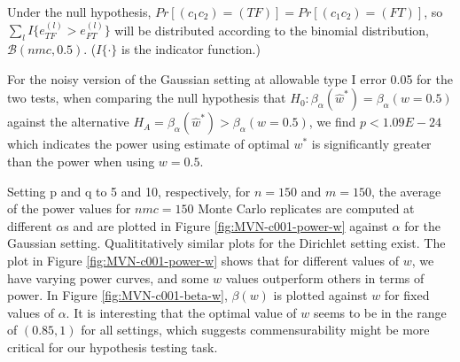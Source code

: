 \documentclass[11pt]{article} %
\begin{document}
Under the null  hypothesis, $Pr[\left(c_1c_2\right)=(TF)]=Pr[\left(c_1c_2\right)=(FT)]$, so $\sum_l{I \{e_{TF}^{(l)}>e_{FT}^{(l)}\}}$ will be distributed according to  the binomial distribution, $\mathcal{B}(nmc,0.5)$. ($I\{\cdot\}$ is the indicator function.) 

For the noisy version of the Gaussian setting at allowable type I error 0.05 for the two tests, when comparing  the null hypothesis that  $H_{0}: \beta_{\alpha}({\hat{w}^*})=\beta_{\alpha}({w=0.5})$ against the alternative $H_{A}=\beta_{\alpha}({\hat{w}^*})>\beta_{\alpha}({w=0.5})$, we find $p<1.09E-24$ which indicates the power using estimate of optimal $w^*$ is significantly greater than the power when using $w=0.5$. 





Setting p and q to 5 and 10, respectively, for $n=150$ and $m=150$, the average of the power values for $nmc=150$ Monte Carlo replicates are computed at  different $\alpha$s and are plotted in Figure \ref{fig:MVN-c001-power-w} against $\alpha$ for the Gaussian setting.  Qualititatively similar plots for the Dirichlet setting  exist.  The plot in Figure \ref{fig:MVN-c001-power-w} shows that for different values of  $w$, we have varying power curves, and some $w$ values outperform others in terms of power. In Figure \ref{fig:MVN-c001-beta-w},  $\beta(w)$ is plotted against $w$ for fixed values of $\alpha$. It is  interesting that the optimal value of $w$ seems to be in the range of $(0.85,1)$ for all settings, which suggests commensurability might be more critical for our hypothesis testing task. 
\end{document}
